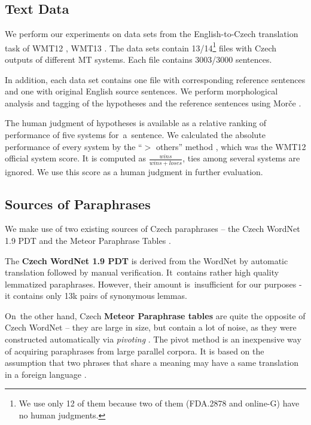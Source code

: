 \documentclass[11pt]{article}
\def\Tref#1{Table~\ref{#1}}
\begin{document}
\subsection{Text Data}
We perform our experiments on data sets from the English-to-Czech translation 
task of WMT12 \cite{wmt12}, WMT13 \cite{wmt13}. The data sets contain 
13/14\footnote{We use only 12 of them because two of them 
(FDA.2878 and online-G) have no human judgments.} files with Czech outputs 
of different MT systems. Each file contains 3003/3000 sentences.

In addition, each data set contains one file with corresponding reference 
sentences and one with original English source sentences. We perform 
morphological analysis and tagging of the hypotheses and the reference 
sentences using Morče \cite{morce:2007}.

The human judgment of hypotheses is available as a relative ranking of 
performance of five systems for~a~sentence. We calculated the absolute 
performance of every system by the “$ > $ others” method \cite{bojar-grains}, 
which was the WMT12 official system score. It is computed as 
$ \frac{wins}{wins+loses} $, ties among several systems are ignored. We use 
this score as a human judgment in further evaluation.

\subsection{Sources of Paraphrases}
\label{meteori}
We make use of two existing sources of Czech paraphrases -- the Czech WordNet 
1.9 PDT \cite{czech-wordnet} and the Meteor Paraphrase Tables \cite{meteor-tables}. 

The \textbf{Czech WordNet 1.9 PDT} is derived from the WordNet \cite{wordnet} 
by automatic translation followed by manual verification. It~contains rather 
high quality lemmatized paraphrases. However, their amount is~insufficient for 
our purposes - it contains only 13k pairs of synonymous lemmas. %

On~the other hand, Czech \textbf{Meteor Paraphrase tables} are quite the 
opposite of Czech WordNet -- they are large in size, but contain a lot of 
noise, as they were constructed automatically via \textit{pivoting} 
\cite{pivoting}. The pivot method is an inexpensive way of acquiring paraphrases 
from large parallel corpora. It is based on the assumption that two phrases 
that share a meaning may have a same translation in a foreign language 
\cite{dyvik}.
\end{document}
